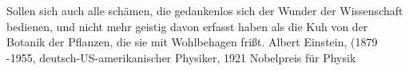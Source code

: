 {Sollen sich auch alle schämen, die gedankenlos sich der Wunder der Wissenschaft bedienen, und nicht mehr geistig davon erfasst haben als die Kuh von der Botanik der Pflanzen, die sie mit Wohlbehagen frißt.}
{Albert Einstein, (1879 -1955, deutsch-US-amerikanischer Physiker, 1921 Nobelpreis für Physik}



\vfill
{}
\newpage





